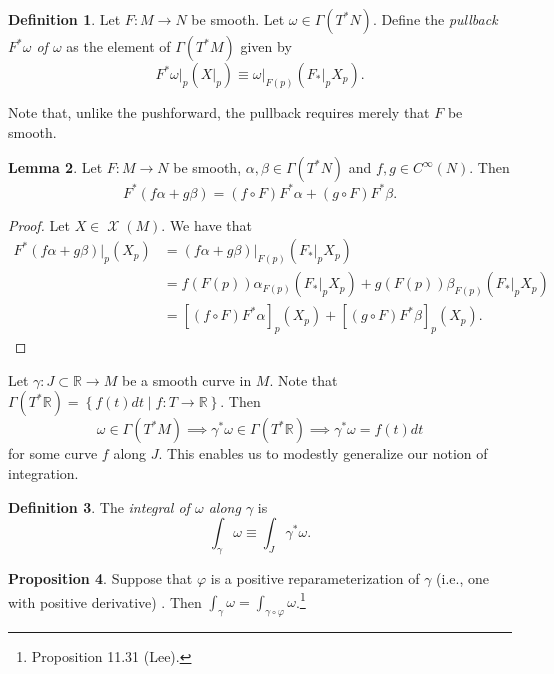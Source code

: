 \documentclass[10pt,letterpaper,cm]{nupset}
\theoremstyle{definition}
\newtheorem{definition}{Definition}[subsection]
\theoremstyle{theorem}
\newtheorem{lemma}[definition]{Lemma}
\newtheorem{prop}[definition]{Proposition}
\theoremstyle{remark}
\newcommand{\R}{\mathbb R}
\newcommand{\1}{\mathbf{1}}
\newcommand{\0}{\vec 0}
\DeclareMathOperator{\vf}{\mathscr{X}}
\begin{document}
\bigskip

\begin{definition}\label{pullback}
Let $F: M \to N$ be smooth. Let $\omega \in \Gamma(T^{\ast}N)$. Define the \textit{pullback $F^{\ast}\omega$ of $\omega$}  as the  element of $\Gamma(T^{\ast}M)$ given by $$F^{\ast}\omega \bigr\rvert_p \left(X \bigr\rvert_p\right) \equiv \omega \bigr\rvert_{F(p)}\left(F_{\ast}\bigr\rvert_p X_p\right).$$ 
\end{definition}

Note that, unlike the pushforward, the pullback requires merely that $F$ be smooth. 

\begin{lemma}
Let $F: M \to N$ be smooth, $\alpha, \beta \in \Gamma(T^{\ast} N)$ and $f, g \in C^{\infty}(N)$. Then $$F^{\ast}(f \alpha + g \beta) = (f \circ F)F^{\ast} \alpha + (g \circ F)F^{\ast} \beta.$$
\end{lemma}
\begin{proof}
Let $X \in \vf(M)$. We have that
\begin{align*}
F^{\ast}(f \alpha + g\beta)\bigr\rvert_p(X_p) & = (f \alpha + g \beta)\bigr\rvert_{F(p)}\left(F_{\ast}\bigr\rvert_p X_p\right) 
\\ & = 
f\left(F(p)\right)\alpha_{F(p)}\left(F_{\ast}\bigr\rvert_p  X_p\right)+ g\left(F(p)\right)\beta_{F(p)}\left(F_{\ast}\bigr\rvert_p X_p\right)
\\ &   = \left[(f\circ F)F^{\ast}\alpha\right]_p (X_p) + \left[(g\circ F) F^{\ast}\beta\right]_p(X_p).
\end{align*}
\end{proof}

Let $\gamma : J \subset \R \to M$ be a smooth curve in $M$.  Note that $\Gamma(T^{\ast}\R) = \left\{f(t)dt \mid f : T \to \R\right\}$. Then
$$ \omega \in \Gamma(T^{\ast}M) \implies \gamma^{\ast} \omega \in \Gamma(T^{\ast}\R) \implies \gamma^{\ast}\omega = f(t)dt$$ for some curve $f$ along $J$. This enables us to modestly generalize our notion of integration.

\begin{definition}
The \textit{integral of $\omega$ along $\gamma$} is $$\int_{\gamma} \omega \equiv \int_J \gamma^{\ast}\omega.$$ 
\end{definition}

\begin{prop}
Suppose that $\varphi$ is a positive reparameterization of $\gamma$ (i.e., one with positive derivative) . Then $\int_{\gamma} \omega = \int_{\gamma \circ \varphi} \omega$.\footnote{Proposition 11.31 (Lee).}
\end{prop}
\end{document}
